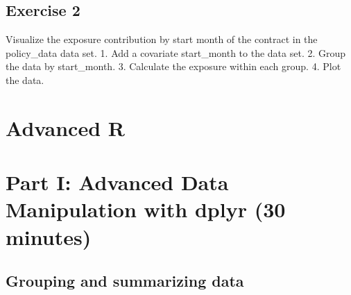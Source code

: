 \documentclass[
]{book}
\begin{document}
\section*{Exercise 2}\label{exercise-2-7}

Visualize the exposure contribution by start month of the contract in the policy\_data data set.
1. Add a covariate start\_month to the data set. 2. Group the data by start\_month.
3. Calculate the exposure within each group.
4. Plot the data.

\chapter*{Advanced R}\label{advanced-r}

\chapter*{Part I: Advanced Data Manipulation with dplyr (30 minutes)}\label{part-i-advanced-data-manipulation-with-dplyr-30-minutes}

\section*{Grouping and summarizing data}\label{grouping-and-summarizing-data}
\end{document}
